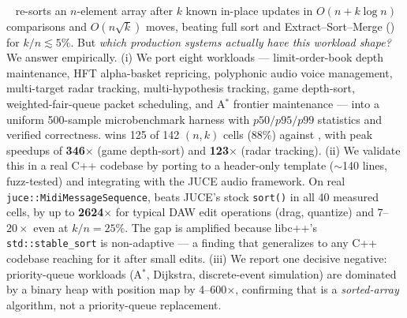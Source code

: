 \DeltaSort~\cite{deltasort} re-sorts an $n$-element array after $k$ known
in-place updates in $O(n + k \log n)$ comparisons and $O(n\sqrt{k})$ moves,
beating full sort and Extract--Sort--Merge (\ESM) for $k/n \lesssim 5\%$.
But \emph{which production systems actually have this workload shape?}
We answer empirically. (i) We port eight workloads ---
limit-order-book depth maintenance, HFT alpha-basket repricing, polyphonic
audio voice management, multi-target radar tracking, multi-hypothesis tracking,
game depth-sort, weighted-fair-queue packet scheduling, and A$^*$ frontier
maintenance --- into a uniform 500-sample microbenchmark harness with
$p50/p95/p99$ statistics and verified correctness. \DeltaSort wins
125 of 142 $(n,k)$ cells (88\%) against \ESM, with peak speedups of
\textbf{346$\times$} (game depth-sort) and \textbf{123$\times$} (radar tracking).
(ii) We validate this in a real C++ codebase by porting \DeltaSort to a
header-only template ($\sim$140 lines, fuzz-tested) and integrating with the
JUCE audio framework. On real \texttt{juce::MidiMessageSequence}, \DeltaSort
beats JUCE's stock \texttt{sort()} in all 40 measured cells, by up to
\textbf{2624$\times$} for typical DAW edit operations (drag, quantize) and
$7$--$20\times$ even at $k/n = 25\%$. The gap is amplified because libc++'s
\texttt{std::stable\_sort} is non-adaptive --- a finding that generalizes
to any C++ codebase reaching for it after small edits.
(iii) We report one decisive negative: priority-queue workloads (A$^*$,
Dijkstra, discrete-event simulation) are dominated by a binary heap with
position map by 4--600$\times$, confirming that \DeltaSort is a
\emph{sorted-array} algorithm, not a priority-queue replacement.
